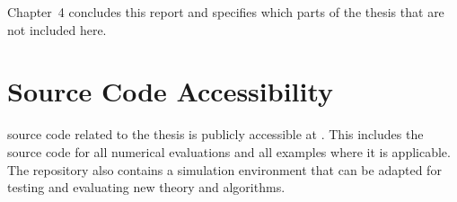 Chapter~4 concludes this report and specifies which parts of the thesis that are not included here.




\section{Source Code Accessibility} \label{sec:intro:source-code} 

\matlab source code related to the thesis is publicly accessible at \githuburl. This includes the source code for all numerical evaluations and all examples where it is applicable. The repository also contains a \abbrDTT simulation environment that can be adapted for testing and evaluating new theory and algorithms.



